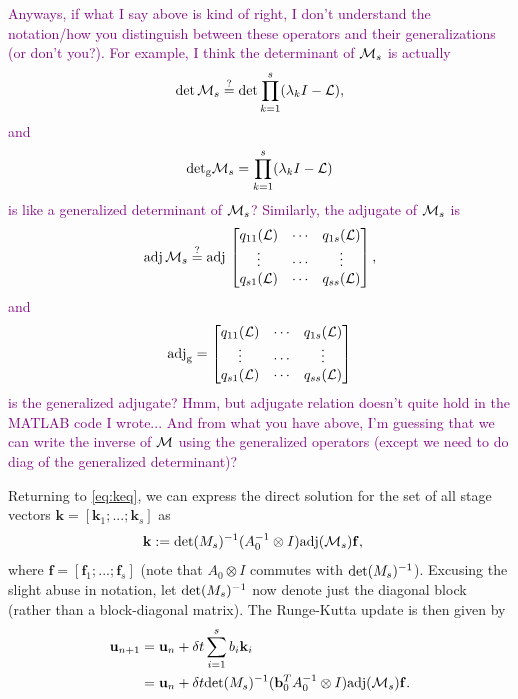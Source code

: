 \documentclass[review]{siamart}
\newcommand{\tcp}{\textcolor{purple}}
\begin{document}
\tcp{Anyways, if what I say above is kind of right, I don't understand the notation/how you distinguish between these operators and their generalizations (or don't you?). For example, I think the determinant of ${\cal M}_s$ is actually
\begin{align*}
\det {\cal M}_s \overset{?}{=} \det \prod_{k = 1}^s (\lambda_k I - {\cal L}),
\end{align*}
and 
\begin{align*}
{\rm det}_{\rm g} {\cal M}_s = \prod_{k = 1}^s (\lambda_k I - {\cal L})
\end{align*}
is like a generalized determinant of ${\cal M}_s$?
Similarly, the adjugate of ${\cal M}_s$ is
\begin{align*}
{\rm adj\,} {\cal M}_s \overset{?}{=} {\rm adj\,} 
\begin{bmatrix}
q_{11} ({\cal L}) & \cdots & q_{1s}({\cal L}) \\
\vdots & \cdots & \vdots \\
q_{s1} ({\cal L}) & \cdots & q_{ss}({\cal L}) 
\end{bmatrix},
\end{align*}
and 
\begin{align*}
{\rm adj}_{\rm g} = \begin{bmatrix}
q_{11} ({\cal L}) & \cdots & q_{1s}({\cal L}) \\
\vdots & \cdots & \vdots \\
q_{s1} ({\cal L}) & \cdots & q_{ss}({\cal L}) 
\end{bmatrix}
\end{align*}
is the generalized adjugate? Hmm, but adjugate relation doesn't quite hold in the MATLAB code I wrote... And from what you have above, I'm guessing that we can write the inverse of ${\cal M}$ using the generalized operators (except we need to do diag of the generalized determinant)?
}

Returning to \eqref{eq:keq}, we can express the direct solution for the set of all
stage vectors ${\mathbf{k}} = [\mathbf{k}_1; ...; \mathbf{k}_s]$ as
%
\begin{align*}
\mathbf{k} &:= \textnormal{det}({M}_s)^{-1}
	(A_0^{-1}\otimes I)\textnormal{adj}(\mathcal{M}_s)\mathbf{f},
\end{align*}
%
where $\mathbf{f} = [\mathbf{f}_1; ...; \mathbf{f}_s]$ (note that
$A_0\otimes I$ commutes with $\textnormal{det}({M}_s)^{-1}$). Excusing the slight
abuse in notation, let $\textnormal{det}({M}_s)^{-1}$ now denote just the diagonal
block (rather than a block-diagonal matrix). The Runge-Kutta update is then given by
%
\begin{align}\nonumber
\mathbf{u}_{n+1} & = \mathbf{u}_n + \delta t\sum_{i=1}^s b_i{\mathbf{k}}_i \\
& = \mathbf{u}_n + \delta t\textnormal{det}({M}_s)^{-1}
	(\mathbf{b}_0^TA_0^{-1}\otimes I)\textnormal{adj}(\mathcal{M}_s)\mathbf{f}.\label{eq:update}
\end{align}
%
\end{document}

